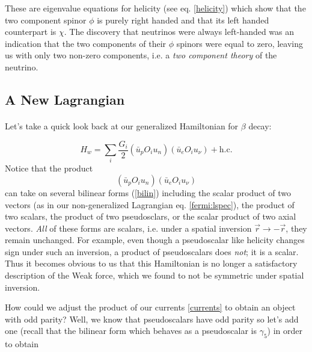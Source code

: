 \documentclass[12pt]{book}
\begin{document}
These are eigenvalue equations for helicity (see eq. \ref{helicity}) which show that the two component spinor $\phi$ is purely right handed and that its left handed counterpart is $\chi$. The discovery that neutrinos were always left-handed was an indication that the two components of their $\phi$ spinors were equal to zero, leaving us with only two non-zero components, i.e. a \emph{two component theory} of the neutrino\cite{commins}.

\subsection{A New Lagrangian}\label{anl}

\paragraph{}Let's take a quick look back at our generalized Hamiltonian for $\beta$ decay:

\begin{equation}
 H_{w}=\displaystyle\sum_{i}\frac{G_{i}}{2}\left(\bar{u}_{p}O_{i}u_{n}\right)\left(\bar{u}_{e}O_{i}u_{\nu}\right)+\text{h.c.}
\end{equation}
Notice that the product
\begin{equation}\label{currents}
\left(\bar{u}_{p}O_{i}u_{n}\right)\left(\bar{u}_{e}O_{i}u_{\nu}\right)
\end{equation}
can take on several bilinear forms (\ref{bilin}) including the scalar product of two vectors (as in our non-generalized Lagrangian eq. \ref{fermi:lspec}), the product of two scalars, the product of two pseudosclars, or the scalar product of two axial vectors. \emph{All} of these forms are scalars, i.e. under a spatial inversion $\vec{r}\rightarrow -\vec{r}$, they remain unchanged. For example, even though a pseudoscalar like helicity changes sign under such an inversion, a product of pseudoscalars does \emph{not}; it is a scalar. Thus it becomes obvious to us that this Hamiltonian is no longer a satisfactory description of the Weak force, which we found to not be symmetric under spatial inversion.

How could we adjust the product of our currents \ref{currents} to obtain an object with odd parity? Well, we know that pseudoscalars have odd parity so let's add one (recall that the bilinear form which behaves as a pseudoscalar is $\gamma_{5}$) in order to obtain
\end{document}
